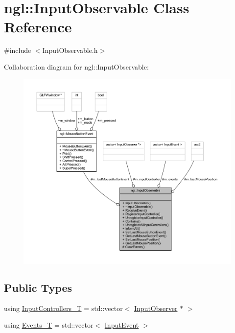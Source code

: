 \hypertarget{classngl_1_1_input_observable}{}\section{ngl\+:\+:Input\+Observable Class Reference}
\label{classngl_1_1_input_observable}


{\ttfamily \#include $<$Input\+Observable.\+h$>$}



Collaboration diagram for ngl\+:\+:Input\+Observable\+:
\nopagebreak
\begin{figure}[H]
\begin{center}
\leavevmode
\includegraphics[width=350pt]{classngl_1_1_input_observable__coll__graph}
\end{center}
\end{figure}
\subsection*{Public Types}
\begin{DoxyCompactItemize}
\item 
using \mbox{\hyperlink{classngl_1_1_input_observable_af9093ebff6abe79d8fd814aab1437416}{Input\+Controllers\+\_\+T}} = std\+::vector$<$ \mbox{\hyperlink{classngl_1_1_input_observer}{Input\+Observer}} $\ast$ $>$
\item 
using \mbox{\hyperlink{classngl_1_1_input_observable_acab630eaf545f2bba70717111bede255}{Events\+\_\+T}} = std\+::vector$<$ \mbox{\hyperlink{structngl_1_1_input_event}{Input\+Event}} $>$
\end{DoxyCompactItemize}
